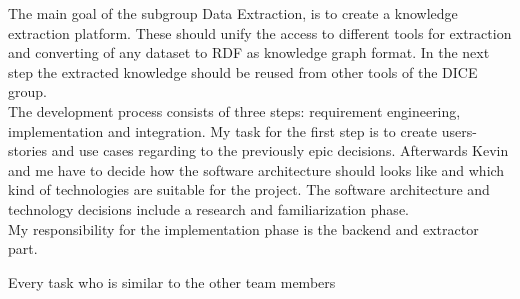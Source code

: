 The main goal of the subgroup Data Extraction, is to create a knowledge extraction platform. These should unify the access to different tools for extraction and converting of any dataset to RDF as knowledge graph format. In the next step the extracted knowledge should be reused from other tools of the DICE group.\\

The development process consists of three steps: requirement engineering, implementation and integration. My task for the first step is to create users-stories and use cases regarding to the previously epic decisions. Afterwards Kevin and me have to decide how the software architecture should looks like and which kind of technologies are suitable for the project. The software architecture and technology decisions include a research and familiarization phase.\\
My responsibility for the implementation phase is the backend and extractor part. 

Every task who is similar to the other team members 
